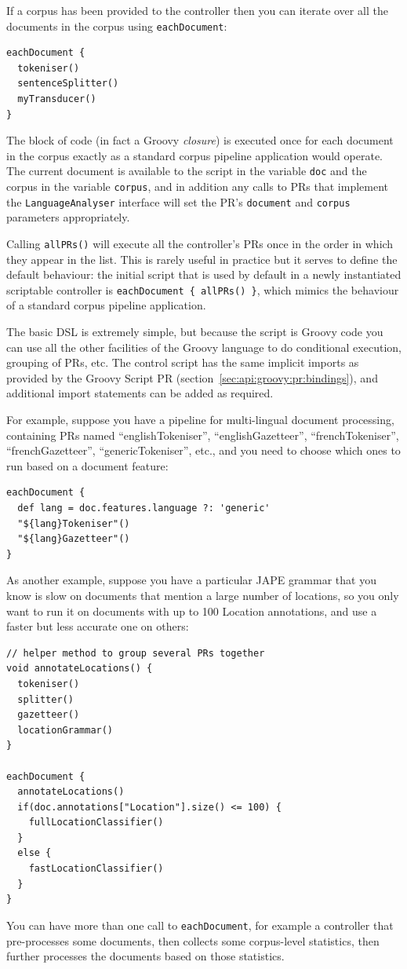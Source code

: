 If a corpus has been provided to the controller then you can iterate over all
the documents in the corpus using \lstinline!eachDocument!:
\begin{lstlisting}
eachDocument {
  tokeniser()
  sentenceSplitter()
  myTransducer()
}
\end{lstlisting}
%
The block of code (in fact a Groovy \emph{closure}) is executed once for each
document in the corpus exactly as a standard corpus pipeline application would
operate.  The current document is available to the script in the variable
\lstinline!doc! and the corpus in the variable \lstinline!corpus!, and in
addition any calls to PRs that implement the \lstinline!LanguageAnalyser!
interface will set the PR's \lstinline!document!  and \lstinline!corpus!
parameters appropriately.


Calling \lstinline!allPRs()! will execute all the controller's PRs once in the
order in which they appear in the list.  This is rarely useful in practice but
it serves to define the default behaviour: the initial script that is used by
default in a newly instantiated scriptable controller is
\lstinline!eachDocument { allPRs() }!, which mimics the behaviour of a standard
corpus pipeline application.


The basic DSL is extremely simple, but because the script is Groovy code you
can use all the other facilities of the Groovy language to do conditional
execution, grouping of PRs, etc.  The control script has the same implicit
imports as provided by the Groovy Script PR
(section~\ref{sec:api:groovy:pr:bindings}), and additional import statements
can be added as required.

For example, suppose you have a pipeline for multi-lingual document processing,
containing PRs named ``englishTokeniser'', ``englishGazetteer'',
``frenchTokeniser'', ``frenchGazetteer'', ``genericTokeniser'', etc., and you
need to choose which ones to run based on a document feature:
\begin{lstlisting}
eachDocument {
  def lang = doc.features.language ?: 'generic'
  "${lang}Tokeniser"()
  "${lang}Gazetteer"()
}
\end{lstlisting}
%
As another example, suppose you have a particular JAPE grammar that you know is
slow on documents that mention a large number of locations, so you only want to
run it on documents with up to 100 Location annotations, and use a faster but
less accurate one on others:
\begin{lstlisting}
// helper method to group several PRs together
void annotateLocations() {
  tokeniser()
  splitter()
  gazetteer()
  locationGrammar()
}

eachDocument {
  annotateLocations()
  if(doc.annotations["Location"].size() <= 100) {
    fullLocationClassifier()
  }
  else {
    fastLocationClassifier()
  }
}
\end{lstlisting}
%
You can have more than one call to \lstinline!eachDocument!, for example a
controller that pre-processes some documents, then collects some corpus-level
statistics, then further processes the documents based on those statistics.

